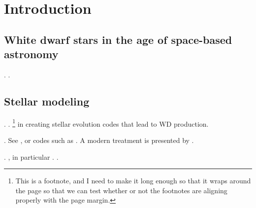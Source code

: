 
\chapter{Introduction}

\section{White dwarf stars in the age of space-based astronomy}
\lipsum*[2][1-2]
\citep{ShapTeuk83}.
\lipsum*[3][3]\citep{HoweETC14, RickETC14}.
\lipsum*[4][1-2]\citep{AmarETC17}

\section{Stellar modeling}

\lipsum*[4][1-5]\citet[see also \citealt{Chan31B}]{Chan35A}.
\lipsum*[2][7]\citet{Lane1870, BethMars39, Schw46}.%
\footnote{%
	This is a footnote, and I need to make it long enough so that it wraps around the page
	so that we can test whether or not the footnotes are aligning properly with the page margin.
}
\lipsum*[6] \citet[see also \citealt{Pacz70a, Pacz70b, Pacz70c}]{Pacz69} in creating stellar evolution codes that lead to WD production.


\lipsum*[8]. See \citet{HenyETC59}, or codes such as \citep[such as][]{PaxtETC10}.
A modern treatment is presented by \citet[Sec.~12.2]{KippWeigWeis12}. 

\lipsum*[1][4] \citep{Vila66, VanH68, KuttSave69, SaveVanHVila69, VanHRichHans72}.
\lipsum*[1][2], in particular \WDEC \citep{BiscMont18}.
\lipsum*[2][1] \citep[\eg][]{Wood90, BradWingWood93, Brad96}.

